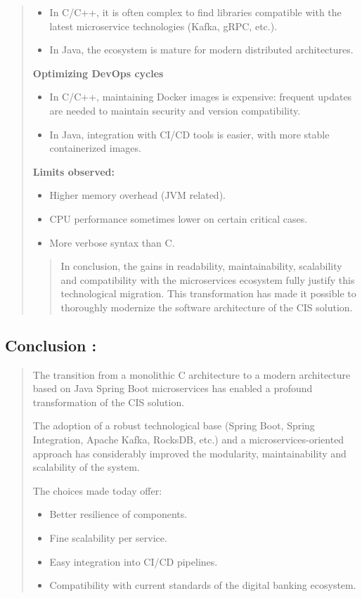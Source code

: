 \documentclass[12pt,a4paper]{report}
\begin{document}
\begin{quote}
\begin{itemize}
\item In C/C++, it is often complex to find libraries compatible with the latest microservice technologies (Kafka, gRPC, etc.).
\item In Java, the ecosystem is mature for modern distributed architectures.
\end{itemize}

\textbf{Optimizing DevOps cycles}

\begin{itemize}
\item In C/C++, maintaining Docker images is expensive: frequent updates are needed to maintain security and version compatibility.
\item In Java, integration with CI/CD tools is easier, with more stable containerized images.
\end{itemize}

\textbf{Limits observed:}

\begin{itemize}
\item Higher memory overhead (JVM related).
\item CPU performance sometimes lower on certain critical cases.
\item More verbose syntax than C.
\end{itemize}

\begin{quote}
In conclusion, the gains in readability, maintainability, scalability
and compatibility with the microservices ecosystem fully justify this
technological migration. This transformation has made it possible to
thoroughly modernize the software architecture of the CIS solution.
\end{quote}
\end{quote}


\subsection{Conclusion :}
\begin{quote}
The transition from a monolithic C architecture to a modern architecture
based on Java Spring Boot microservices has enabled a profound
transformation of the CIS solution.

The adoption of a robust technological base (Spring Boot, Spring
Integration, Apache Kafka, RocksDB, etc.) and a microservices-oriented
approach has considerably improved the modularity, maintainability and
scalability of the system.

The choices made today offer:


\begin{itemize}
\item Better resilience of components.
\item Fine scalability per service.
\item Easy integration into CI/CD pipelines.
\item Compatibility with current standards of the digital banking ecosystem.
\end{itemize}
\end{quote}
\end{document}

